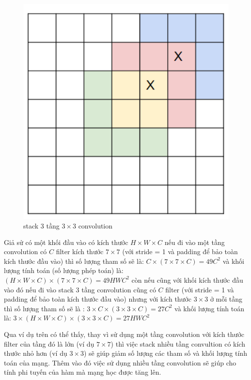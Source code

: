 \documentclass[a4paper,12pt]{report}
\begin{document}
\begin{figure}[H]
\centering
\includegraphics[scale=0.4]{3conv3x3.png}
\caption{stack 3 tầng $3 \times 3$ convolution}
\label{fig_3conv3x3}
\end{figure}
\par Giả sử có một khối đầu vào có kích thước $H \times W \times C$ nếu đi vào một tầng convolution có $C$ filter kích thước $7 \times 7$ (với stride = 1 và padding để bảo toàn kích thước đầu vào) thì số lượng tham số sẽ là: $C \times (7 \times 7 \times C) = 49C^2$ và khối lượng tính toán (số lượng phép toán) là: $(H \times W \times C) \times (7 \times 7 \times C) = 49HWC^2$ còn nếu cũng với khối kích thước đầu vào đó nếu đi vào stack 3 tầng convolution cũng có $C$ filter (với stride = 1 và padding để bảo toàn kích thước đầu vào) nhưng với kích thước $3 \times 3$ ở mỗi tầng thì số lượng tham số sẽ là : $3 \times C \times (3 \times 3 \times C) = 27C^2$ và khối lượng tính toán là: $3 \times (H \times W \times C) \times (3 \times 3 \times C) = 27HWC^2$
\par Qua ví dụ trên có thể thấy, thay vì sử dụng một tầng convolution với kích thước filter của tầng đó là lớn (ví dụ $7 \times 7$) thì việc stack nhiều tầng convultion có kích thước nhỏ hơn (ví dụ $3 \times 3$) sẽ giúp giảm số lượng các tham số và khối lượng tính toán của mạng. Thêm vào đó việc sử dụng nhiều tầng convolution sẽ giúp cho tính phi tuyến của hàm mà mạng học được tăng lên. 
\end{document}
